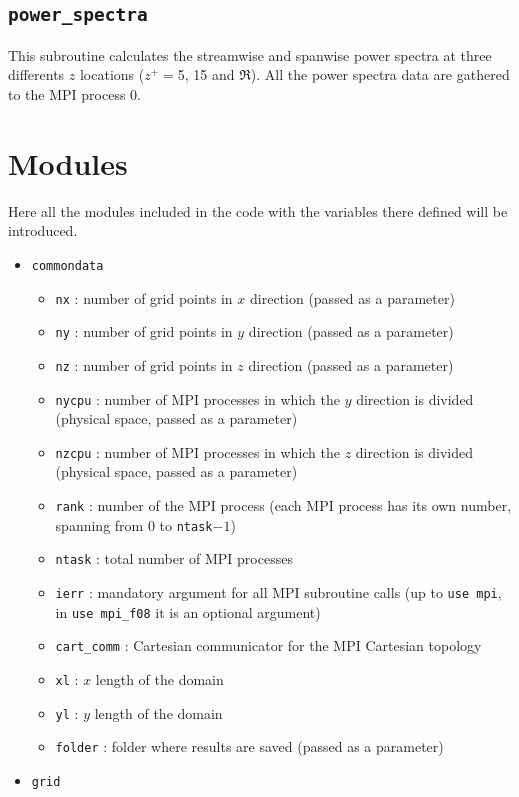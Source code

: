 \subsection{\texttt{power\_spectra}}
This subroutine calculates the streamwise and spanwise power spectra at three differents $z$ locations ($z^+=$5, 15 and $\Re$). All the power spectra data are gathered to the MPI process 0.


\section{Modules}
Here all the modules included in the code with the variables there defined will be introduced.
\begin{itemize}
\item \texttt{commondata}
\begin{itemize}
\item \texttt{nx} : number of grid points in $x$ direction (passed as a parameter)
\item \texttt{ny} : number of grid points in $y$ direction (passed as a parameter)
\item \texttt{nz} : number of grid points in $z$ direction (passed as a parameter)
\item \texttt{nycpu} : number of MPI processes in which the $y$ direction is divided (physical space, passed as a parameter)
\item \texttt{nzcpu} : number of MPI processes in which the $z$ direction is divided (physical space, passed as a parameter)
\item \texttt{rank} : number of the MPI process (each MPI process has its own number, spanning from 0 to \texttt{ntask}$-1$)
\item \texttt{ntask} : total number of MPI processes
\item \texttt{ierr} : mandatory argument for all MPI subroutine calls (up to \texttt{use mpi}, in \texttt{use mpi\_f08} it is an optional argument)
\item \texttt{cart\_comm} : Cartesian communicator for the MPI Cartesian topology
\item \texttt{xl} : $x$ length of the domain
\item \texttt{yl} : $y$ length of the domain
\item \texttt{folder} : folder where results are saved (passed as a parameter)
\end{itemize}
\item \texttt{grid}
\begin{itemize}

\end{itemize}
\end{itemize}
